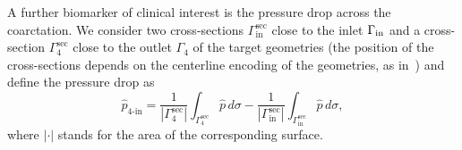 A further biomarker of clinical interest is the pressure drop across the coarctation. We consider two cross-sections $\Gamma^{\text{sec}}_\text{in}$ close to the inlet $\Gamma_{\rm in}$ and a cross-section $\Gamma^{\text{sec}}_4$ close to the outlet $\Gamma_4$ of the target geometries (the position of the cross-sections depends on the centerline encoding of the geometries, as in~\cite{katz2023impact}) and define the pressure drop as
\begin{equation}
  \widehat{p}_{4\text{-}\text{in}} = \frac{1}{\left|\Gamma^{\text{sec}}_4\right|}\int_{\Gamma^{\text{sec}}_4}\widehat{p}\,d\sigma-\frac{1}{|\Gamma^{\text{sec}}_\text{in}|}\int_{\Gamma^{\text{sec}}_\text{in}}\widehat{p}\,d\sigma,
\end{equation}
where $| \cdot |$ stands for the area of the corresponding surface. 


